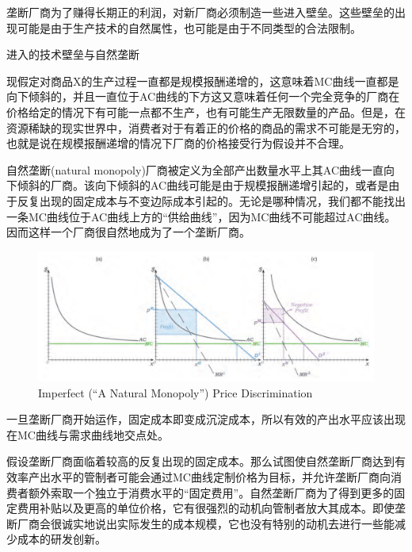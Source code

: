 \documentclass{article}
\begin{document}
垄断厂商为了赚得长期正的利润，对新厂商必须制造一些进入壁垒。这些壁垒的出现可能是由于生产技术的自然属性，也可能是由于不同类型的合法限制。

\hspace*{\fill}

进入的技术壁垒与自然垄断

现假定对商品X的生产过程一直都是规模报酬递增的，这意味着MC曲线一直都是向下倾斜的，并且一直位于AC曲线的下方这又意味着任何一个完全竞争的厂商在价格给定的情况下有可能一点都不生产，也有可能生产无限数量的产品。但是，在资源稀缺的现实世界中，消费者对于有着正的价格的商品的需求不可能是无穷的，也就是说在规模报酬递增的情况下厂商的价格接受行为假设并不合理。

自然垄断(natural monopoly)厂商被定义为全部产出数量水平上其AC曲线一直向下倾斜的厂商。该向下倾斜的AC曲线可能是由于规模报酬递增引起的，或者是由于反复出现的固定成本与不变边际成本引起的。无论是哪种情况，我们都不能找出一条MC曲线位于AC曲线上方的“供给曲线”，因为MC曲线不可能超过AC曲线。因而这样一个厂商很自然地成为了一个垄断厂商。

\begin{figure}[H] %
	\centering %
	\includegraphics[width=1\textwidth]{23_5} %
	\caption{Imperfect (“A Natural Monopoly”) Price Discrimination} %
	\label{Fig.main6} %
\end{figure}

一旦垄断厂商开始运作，固定成本即变成沉淀成本，所以有效的产出水平应该出现在MC曲线与需求曲线地交点处。

假设垄断厂商面临着较高的反复出现的固定成本。那么试图使自然垄断厂商达到有效率产出水平的管制者可能会通过MC曲线定制价格为目标，并允许垄断厂商向消费者额外索取一个独立于消费水平的“固定费用”。自然垄断厂商为了得到更多的固定费用补贴以及更高的单位价格，它有很强烈的动机向管制者放大其成本。即使垄断厂商会很诚实地说出实际发生的成本规模，它也没有特别的动机去进行一些能减少成本的研发创新。
\end{document}
